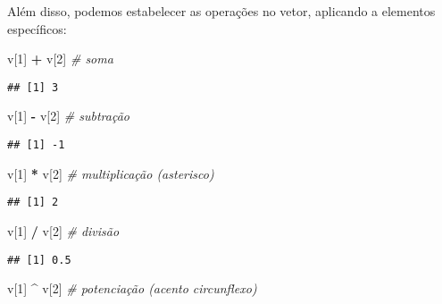 \documentclass[
]{book}
\newenvironment{Shaded}{\begin{snugshade}}{\end{snugshade}}
\newcommand{\CommentTok}[1]{\textcolor[rgb]{0.56,0.35,0.01}{\textit{#1}}}
\newcommand{\DecValTok}[1]{\textcolor[rgb]{0.00,0.00,0.81}{#1}}
\newcommand{\NormalTok}[1]{#1}
\newcommand{\OperatorTok}[1]{\textcolor[rgb]{0.81,0.36,0.00}{\textbf{#1}}}
\newcommand{\StringTok}[1]{\textcolor[rgb]{0.31,0.60,0.02}{#1}}
\begin{document}
Além disso, podemos estabelecer as operações no vetor, aplicando a elementos específicos:

\begin{Shaded}
\begin{Highlighting}[]
\NormalTok{v[}\DecValTok{1}\NormalTok{] }\OperatorTok{+}\StringTok{ }\NormalTok{v[}\DecValTok{2}\NormalTok{] }\CommentTok{# soma}
\end{Highlighting}
\end{Shaded}

\begin{verbatim}
## [1] 3
\end{verbatim}

\begin{Shaded}
\begin{Highlighting}[]
\NormalTok{v[}\DecValTok{1}\NormalTok{] }\OperatorTok{-}\StringTok{ }\NormalTok{v[}\DecValTok{2}\NormalTok{] }\CommentTok{# subtração}
\end{Highlighting}
\end{Shaded}

\begin{verbatim}
## [1] -1
\end{verbatim}

\begin{Shaded}
\begin{Highlighting}[]
\NormalTok{v[}\DecValTok{1}\NormalTok{] }\OperatorTok{*}\StringTok{ }\NormalTok{v[}\DecValTok{2}\NormalTok{] }\CommentTok{# multiplicação (asterisco)}
\end{Highlighting}
\end{Shaded}

\begin{verbatim}
## [1] 2
\end{verbatim}

\begin{Shaded}
\begin{Highlighting}[]
\NormalTok{v[}\DecValTok{1}\NormalTok{] }\OperatorTok{/}\StringTok{ }\NormalTok{v[}\DecValTok{2}\NormalTok{] }\CommentTok{# divisão}
\end{Highlighting}
\end{Shaded}

\begin{verbatim}
## [1] 0.5
\end{verbatim}

\begin{Shaded}
\begin{Highlighting}[]
\NormalTok{v[}\DecValTok{1}\NormalTok{] }\OperatorTok{^}\StringTok{ }\NormalTok{v[}\DecValTok{2}\NormalTok{] }\CommentTok{# potenciação (acento circunflexo)}
\end{Highlighting}
\end{Shaded}
\end{document}
